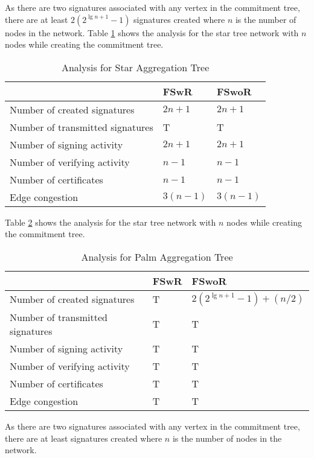 	As there are two signatures associated with any vertex in the commitment tree, there are at least $2 (2^{\lg n + 1} - 1)$ signatures created where $n$ is the number of nodes in the network.
	Table \ref{table:Analysis table for Star Aggregation Tree} shows the analysis for the star tree network with $n$ nodes while creating the commitment tree.
	\begin{table}[!htb]	
		\begin{center}
			\begin{tabular}{ |l| l| l| }
		    \hline
		    & FSwR & FSwoR \\
		    \hline
		    Number of created signatures & $2n + 1$ & $2n + 1$ \\	
		    \hline
		    Number of transmitted signatures & T & T\\
		    \hline
		    Number of signing activity & $2n + 1$ & $2n + 1$ \\
		    \hline
		    Number of verifying activity & $n - 1$ & $n - 1$ \\
		    \hline
		    Number of certificates & $n - 1$ & $n - 1$ \\
		    \hline
		    Edge congestion & $3(n - 1)$ & $3(n - 1)$\\
		    \hline
			\end{tabular}
		\end{center}
  	\caption{Analysis for Star Aggregation Tree}
	  \label{table:Analysis table for Star Aggregation Tree}
  \end{table}

  Table \ref{table:Analysis table for Palm Aggregation Tree} shows the analysis for the star tree network with $n$ nodes while creating the commitment tree.
	\begin{table}[!htb]	
		\begin{center}
			\begin{tabular}{ |l| l| l| }
		    \hline
		    & FSwR & FSwoR \\
		    \hline
		    Number of created signatures & T & $2 (2^{\lg n + 1} - 1) + (n / 2)$ \\	
		    \hline
		    Number of transmitted signatures & T & T\\
		    \hline
		    Number of signing activity & T & T \\
		    \hline
		    Number of verifying activity & T & T \\
		    \hline
		    Number of certificates & T & T \\
		    \hline
		    Edge congestion & T & T\\
		    \hline
			\end{tabular}
		\end{center}
  	\caption{Analysis for Palm Aggregation Tree}
	  \label{table:Analysis table for Palm Aggregation Tree}
  \end{table}
	As there are two signatures associated with any vertex in the commitment tree, there are at least  signatures created where $n$ is the number of nodes in the network.
	
